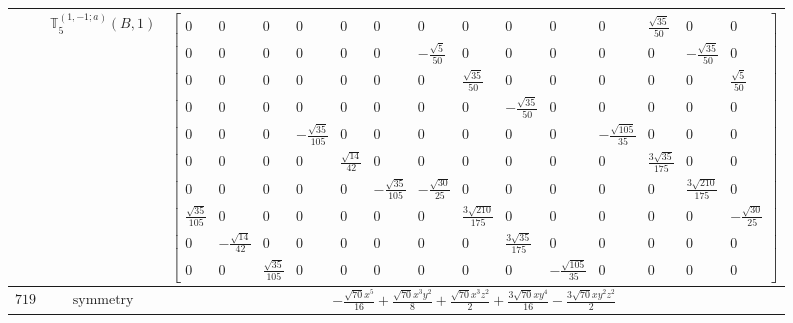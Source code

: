 \documentclass[fleqn,8pt,landscape]{jsarticle}
\begin{document}
\begin{longtable}{ccc}
$  $ & $ \mathbb{T}_{5}^{(1,-1;a)}(B,1) $ & $ \begin{bmatrix} 0 & 0 & 0 & 0 & 0 & 0 & 0 & 0 & 0 & 0 & 0 & \frac{\sqrt{35}}{50} & 0 & 0 \\ 0 & 0 & 0 & 0 & 0 & 0 & - \frac{\sqrt{5}}{50} & 0 & 0 & 0 & 0 & 0 & - \frac{\sqrt{35}}{50} & 0 \\ 0 & 0 & 0 & 0 & 0 & 0 & 0 & \frac{\sqrt{35}}{50} & 0 & 0 & 0 & 0 & 0 & \frac{\sqrt{5}}{50} \\ 0 & 0 & 0 & 0 & 0 & 0 & 0 & 0 & - \frac{\sqrt{35}}{50} & 0 & 0 & 0 & 0 & 0 \\ 0 & 0 & 0 & - \frac{\sqrt{35}}{105} & 0 & 0 & 0 & 0 & 0 & 0 & - \frac{\sqrt{105}}{35} & 0 & 0 & 0 \\ 0 & 0 & 0 & 0 & \frac{\sqrt{14}}{42} & 0 & 0 & 0 & 0 & 0 & 0 & \frac{3 \sqrt{35}}{175} & 0 & 0 \\ 0 & 0 & 0 & 0 & 0 & - \frac{\sqrt{35}}{105} & - \frac{\sqrt{30}}{25} & 0 & 0 & 0 & 0 & 0 & \frac{3 \sqrt{210}}{175} & 0 \\ \frac{\sqrt{35}}{105} & 0 & 0 & 0 & 0 & 0 & 0 & \frac{3 \sqrt{210}}{175} & 0 & 0 & 0 & 0 & 0 & - \frac{\sqrt{30}}{25} \\ 0 & - \frac{\sqrt{14}}{42} & 0 & 0 & 0 & 0 & 0 & 0 & \frac{3 \sqrt{35}}{175} & 0 & 0 & 0 & 0 & 0 \\ 0 & 0 & \frac{\sqrt{35}}{105} & 0 & 0 & 0 & 0 & 0 & 0 & - \frac{\sqrt{105}}{35} & 0 & 0 & 0 & 0 \end{bmatrix} $ \\ \hline
$ 719 $ & $ \text{symmetry} $ & $ - \frac{\sqrt{70} x^{5}}{16} + \frac{\sqrt{70} x^{3} y^{2}}{8} + \frac{\sqrt{70} x^{3} z^{2}}{2} + \frac{3 \sqrt{70} x y^{4}}{16} - \frac{3 \sqrt{70} x y^{2} z^{2}}{2} $ \\

\end{longtable}
\end{document}
